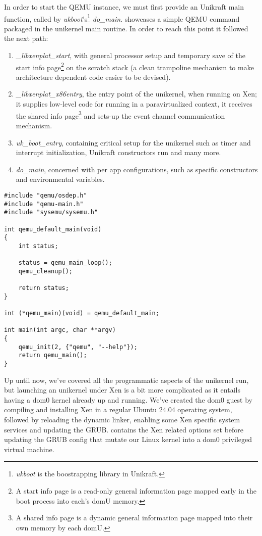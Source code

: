 In order to start the QEMU instance, we must first provide an Unikraft main function, called by \textit{ukboot}'s\footnote{\textit{ukboot} is the boostrapping library in Unikraft.} \textit{do_main}.
 showcases a simple QEMU command packaged in the unikernel main routine.
In order to reach this point it followed the next path:

\begin{enumerate}
  \item \textit{_libxenplat_start}, with general processor setup and temporary save of the start info page\footnote{A start info page is a read-only general information page mapped early in the boot process into each's domU memory.} on the scratch stack (a clean trampoline mechanism to make architecture dependent code easier to be devised).
  \item \textit{_libxenplat_x86entry}, the entry point of the unikernel, when running on Xen; it supplies low-level code for running in a paravirtualized context, it receives the shared info page\footnote{A shared info page is a dynamic general information page mapped into their own memory by each domU.} and sets-up the event channel communication mechanism.
  \item \textit{uk_boot_entry}, containing critical setup for the unikernel such as timer and interrupt initialization, Unikraft constructors run and many more.
  \item \textit{do_main}, concerned with per app configurations, such as specific constructors and environmental variables.
\end{enumerate}

\lstset{language=C,caption=Unikraft main,label=lst:unikraft-main}
\begin{lstlisting}
#include "qemu/osdep.h"
#include "qemu-main.h"
#include "sysemu/sysemu.h"

int qemu_default_main(void)
{
    int status;

    status = qemu_main_loop();
    qemu_cleanup();

    return status;
}

int (*qemu_main)(void) = qemu_default_main;

int main(int argc, char **argv)
{
    qemu_init(2, {"qemu", "--help"});
    return qemu_main();
}
\end{lstlisting}

Up until now, we've covered all the programmatic aspects of the unikernel run, but launching an unikernel under Xen is a bit more complicated as it entails having a dom0 kernel already up and running.
We've created the dom0 guest by compiling and installing Xen in a regular Ubuntu 24.04 operating system, followed by reloading the dynamic linker, enabling some Xen specific system services and updating the GRUB.
 contains the Xen related options set before updating the GRUB config that mutate our Linux kernel into a dom0 privileged virtual machine.

